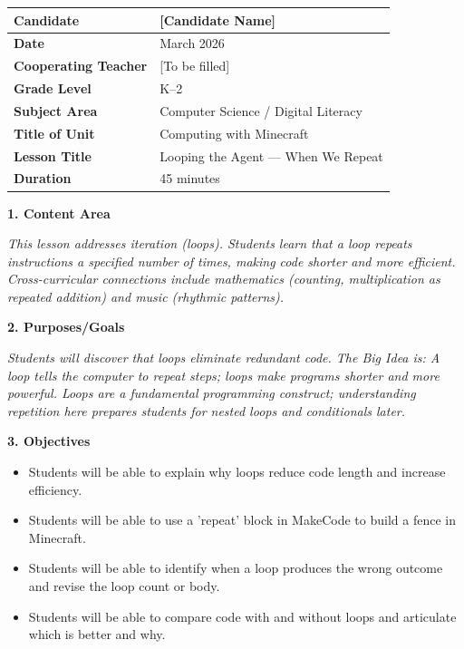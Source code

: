 \documentclass[11pt,letterpaper]{article}
\begin{document}
\begin{longtable}{|L{0.28\textwidth}|L{0.65\textwidth}|}
\hline
\textbf{Candidate}  & [Candidate Name]  \\
\hline
\textbf{Date}  & March 2026  \\
\hline
\textbf{Cooperating Teacher}  & [To be filled]  \\
\hline
\textbf{Grade Level}  & K--2  \\
\hline
\textbf{Subject Area}  & Computer Science / Digital Literacy  \\
\hline
\textbf{Title of Unit}  & Computing with Minecraft  \\
\hline
\textbf{Lesson Title}  & Looping the Agent --- When We Repeat  \\
\hline
\textbf{Duration}  & 45 minutes  \\
\hline
\end{longtable}

\textbf{1. Content Area}

\textit{This lesson addresses iteration (loops). Students learn that a loop repeats instructions a specified number of times, making code shorter and more efficient. Cross-curricular connections include mathematics (counting, multiplication as repeated addition) and music (rhythmic patterns).}

\textbf{2. Purposes/Goals}

\textit{Students will discover that loops eliminate redundant code. The Big Idea is: A loop tells the computer to repeat steps; loops make programs shorter and more powerful. Loops are a fundamental programming construct; understanding repetition here prepares students for nested loops and conditionals later.}

\textbf{3. Objectives}

\begin{itemize}
  \item Students will be able to explain why loops reduce code length and increase efficiency.

  \item Students will be able to use a 'repeat' block in MakeCode to build a fence in Minecraft.

  \item Students will be able to identify when a loop produces the wrong outcome and revise the loop count or body.

  \item Students will be able to compare code with and without loops and articulate which is better and why.
\end{itemize}
\end{document}

